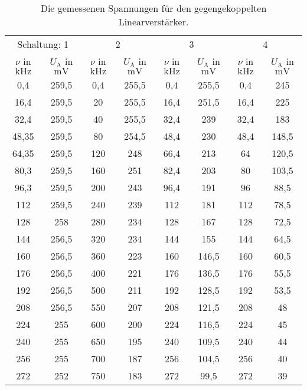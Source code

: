 \documentclass[
  bibliography=totoc,     %
  captions=tableheading,  %
  titlepage=firstiscover, %
]{scrartcl}
\begin{document}
\begin{table}
  \centering
  \caption{Die gemessenen Spannungen für den gegengekoppelten Linearverstärker.}
  \label{tab:messwerte1}
  \begin{tabular}{c c c c c c c c}
    \toprule
    \multicolumn{2}{c}{Schaltung: 1} & \multicolumn{2}{c}{2} & \multicolumn{2}{c}{3} & \multicolumn{2}{c}{4} \\
    $\nu$ in $\si{\kilo\hertz}$ & $U_\text{A}$ in $\si{\milli\volt}$ & $\nu$ in $\si{\kilo\hertz}$ & $U_\text{A}$ in $\si{\milli\volt}$ & $\nu$ in $\si{\kilo\hertz}$ & $U_\text{A}$ in $\si{\milli\volt}$ & $\nu$ in $\si{\kilo\hertz}$ & $U_\text{A}$ in $\si{\milli\volt}$ \\
    \midrule
    0,4   & 259,5 & 0,4  & 255,5 & 0,4  & 255,5 & 0,4  & 245   \\
    16,4  & 259,5 & 20   & 255,5 & 16,4 & 251,5 & 16,4 & 225   \\
    32,4  & 259,5 & 40   & 255,5 & 32,4 & 239   & 32,4 & 183   \\
    48,35 & 259,5 & 80   & 254,5 & 48,4 & 230   & 48,4 & 148,5 \\
    64,35 & 259,5 & 120  & 248   & 66,4 & 213   & 64   & 120,5 \\
    80,3  & 259,5 & 160  & 251   & 82,4 & 203   & 80   & 103,5 \\
    96,3  & 259,5 & 200  & 243   & 96,4 & 191   & 96   & 88,5  \\
    112   & 259,5 & 240  & 239   & 112  & 181   & 112  & 78,5  \\
    128   & 258   & 280  & 234   & 128  & 167   & 128  & 72,5  \\
    144   & 256,5 & 320  & 234   & 144  & 155   & 144  & 64,5  \\
    160   & 256,5 & 360  & 223   & 160  & 146,5 & 160  & 60,5  \\
    176   & 256,5 & 400  & 221   & 176  & 136,5 & 176  & 55,5  \\
    192   & 256,5 & 500  & 211   & 192  & 128,5 & 192  & 53,5  \\
    208   & 256,5 & 550  & 207   & 208  & 121,5 & 208  & 48    \\
    224   & 255   & 600  & 200   & 224  & 116,5 & 224  & 45    \\
    240   & 255   & 650  & 195   & 240  & 109,5 & 240  & 44    \\
    256   & 255   & 700  & 187   & 256  & 104,5 & 256  & 40    \\
    272   & 252   & 750  & 183   & 272  & 99,5  & 272  & 39    \\

\end{tabular}
\end{table}
\end{document}

